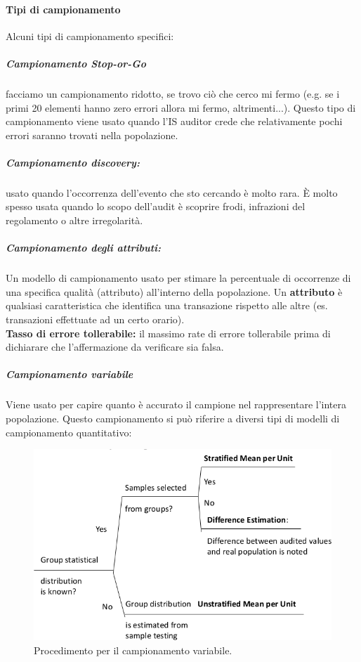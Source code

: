 

\paragraph{Tipi di campionamento} Alcuni tipi di campionamento specifici:

\subparagraph*{Campionamento Stop-or-Go}
facciamo un campionamento ridotto, se trovo
ciò che cerco mi fermo (e.g. se i primi 20 elementi hanno zero errori allora mi fermo,
altrimenti...). Questo tipo di campionamento viene usato
quando l'IS auditor crede che relativamente pochi errori saranno
trovati nella popolazione.

\subparagraph*{Campionamento discovery:} usato quando
l'occorrenza dell'evento che sto cercando è molto rara.
È molto spesso usata quando lo scopo dell'audit è scoprire frodi,
infrazioni del regolamento o altre irregolarità.

\subparagraph*{Campionamento degli attributi:}
Un modello di campionamento usato per stimare la percentuale di
occorrenze di una specifica qualità (attributo) all'interno della
popolazione. Un \textbf{attributo} è qualsiasi
caratteristica che identifica una transazione rispetto alle altre (es.
transazioni effettuate ad un certo orario).\\
\textbf{Tasso di errore tollerabile:} il massimo rate di errore
tollerabile prima di dichiarare che l'affermazione da verificare
sia falsa.\\


\subparagraph*{Campionamento variabile}
Viene usato per capire quanto è accurato il campione nel rappresentare
l'intera popolazione. Questo campionamento si può riferire
a diversi tipi di modelli di campionamento quantitativo:


\begin{figure}[h!]
        \begin{center}
                \includegraphics[scale=0.5]{res/img/variable_sampling.png}
        \end{center}
        \caption{Procedimento per il campionamento variabile.}
        \label{fig:variable:sampling}
\end{figure}

